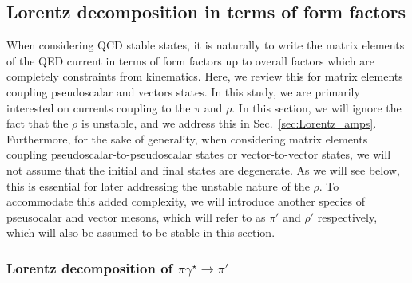  \subsection{Lorentz decomposition in terms of form factors \label{sec:Lorentz_FFs}}
When considering QCD stable states, it is naturally to write the matrix elements of the QED current in terms of form factors up to overall factors which are completely constraints from kinematics. Here, we review this for matrix elements coupling pseudoscalar and vectors states. In this study, we are primarily interested on currents coupling to the $\pi$ and $\rho$. In this section, we will ignore the fact that the $\rho$ is unstable, and we address this in Sec.~\ref{sec:Lorentz_amps}. Furthermore, for the sake of generality, when considering matrix elements coupling pseudoscalar-to-pseudoscalar states or vector-to-vector states, we will not assume that the initial and final states are degenerate. As we will see below, this is essential for later addressing the unstable nature of the $\rho$. To accommodate this added complexity, we will introduce another species of pseusocalar and vector mesons, which will refer to as $\pi'$ and $\rho'$ respectively, which will also be assumed to be stable in this section. 



\subsubsection{Lorentz decomposition of $\pi\gamma^\star\to\pi'$}


